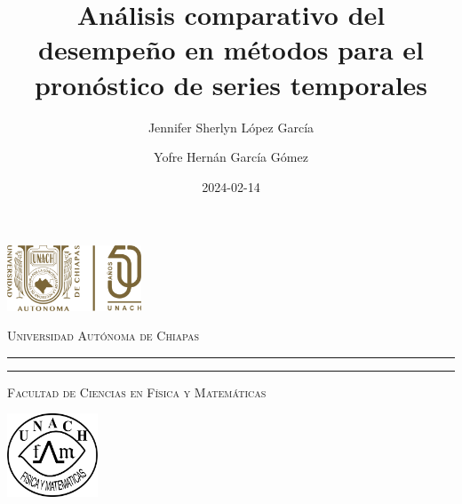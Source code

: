 \documentclass[
  us-letterpaper,
]{scrreprt}
\title{Análisis comparativo del desempeño en métodos para el pronóstico
de series temporales}
\author{Jennifer Sherlyn López García \and Yofre Hernán García Gómez}
\date{2024-02-14}
\theoremstyle{plain}
\theoremstyle{definition}
\theoremstyle{definition}
\theoremstyle{plain}
\theoremstyle{remark}
\begin{document}
\begin{titlepage}
\hspace{-1.7cm} %
\begin{minipage}[t][0.03\textheight][c]{0.22\textwidth}
        \includegraphics[width=4.0cm]{LOGO50.png}
\end{minipage}\hspace{0.9cm}
\begin{minipage}[t][0.03\textheight][c]{0.69\textwidth}
\begin{center}
                \textsc{\huge Universidad Autónoma de Chiapas}\\[0.3cm]
                \hrule height 2.5pt
                \vspace{0.2cm}
                \hrule height1pt
                \vspace{0.3cm}
                \textsc{\Large Facultad de Ciencias en Física y Matemáticas}
\end{center}
\end{minipage}\hspace{0.2cm}
\begin{minipage}[t][0.03\textheight][c]{0.2\textwidth}
		\includegraphics[width=2.7cm]{logofcfm.png}
\end{minipage}\\
\begin{minipage}[t][0.93\textheight][c]{0.06\textwidth}
\vspace{60pt}
    \begin{center}
        \vrule width1pt height18cm
        \vspace{5mm}
        \vrule width2.5pt height18cm
        \vspace{5mm}
        \vrule width1pt height18cm
   \end{center}
\end{minipage}\hspace{1.3cm} %
\begin{minipage}[t][0.95\textheight][c]{0.76\textwidth}


\end{minipage}
\end{titlepage}
\end{document}
